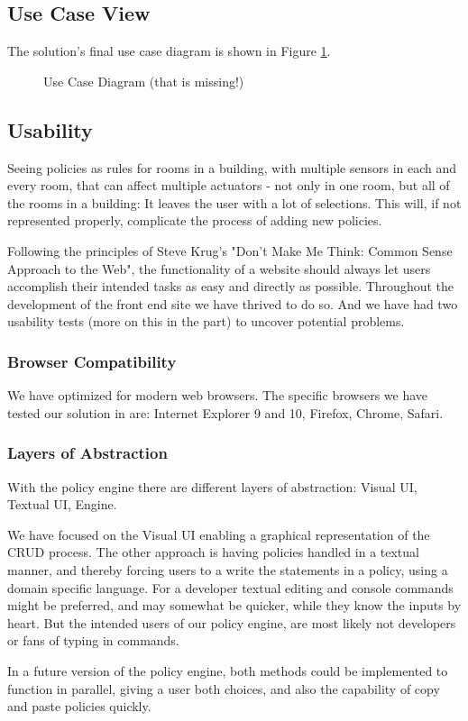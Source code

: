 \subsection{Use Case View}
The solution's final use case diagram is shown in Figure \ref{fig:usecasediagram}.

\begin{figure}[ht]
\centering
\caption{Use Case Diagram (that is missing!)}
\label{fig:usecasediagram}
\end{figure}


\subsection{Usability}
Seeing policies as rules for rooms in a building, with multiple sensors in each and every room, that can affect multiple actuators - not only in one room, but all of the rooms in a building: It leaves the user with a lot of selections. 
This will, if not represented properly, complicate the process of adding new policies.

Following the principles of Steve Krug's "Don't Make Me Think: Common Sense Approach to the Web"\cite{Krug:2005:DMM:1051204}, the functionality of a website should always let users accomplish their intended tasks as easy and directly as possible.
Throughout the development of the front end site we have thrived to do so. And we have had two usability tests (more on this in the  part) to uncover potential problems.

\subsubsection{Browser Compatibility}
We have optimized for modern web browsers. The specific browsers we have tested our solution in are: Internet Explorer 9 and 10, Firefox, Chrome, Safari. 

\subsubsection{Layers of Abstraction}
With the policy engine there are different layers of abstraction: Visual UI, Textual UI, Engine.

We have focused on the Visual UI enabling a graphical representation of the CRUD process. The other approach is having policies handled in a textual manner, and thereby forcing users to a write the statements in a policy, using a domain specific language. For a developer textual editing and console commands might be preferred, and may somewhat be quicker, while they know the inputs by heart. But the intended users of our policy engine, are most likely not developers or fans of typing in commands.

In a future version of the policy engine, both methods could be implemented to function in parallel, giving a user both choices, and also the capability of copy and paste policies quickly.